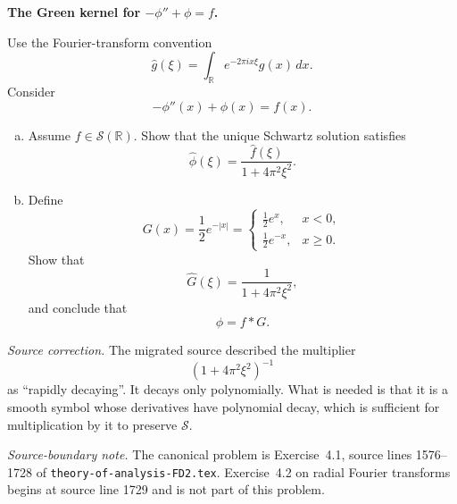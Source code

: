 \begin{problem}[CP-III-0014]
\label{prob:cp-iii-0014}
\textbf{The Green kernel for \(-\phi''+\phi=f\).}

Use the Fourier-transform convention
\[
\widehat g(\xi)
=
\int_{\mathbb R}
e^{-2\pi i x\xi}g(x)\,dx.
\]
Consider
\[
-\phi''(x)+\phi(x)=f(x).
\]

\begin{enumerate}[(a)]
\item Assume \(f\in\mathcal S(\mathbb R)\). Show that the unique Schwartz
solution satisfies
\[
\widehat\phi(\xi)
=
\frac{\widehat f(\xi)}
{1+4\pi^2\xi^2}.
\]

\item Define
\[
G(x)
=
\frac12e^{-|x|}
=
\begin{cases}
\frac12e^x,&x<0,\\[1mm]
\frac12e^{-x},&x\ge0.
\end{cases}
\]
Show that
\[
\widehat G(\xi)
=
\frac1{1+4\pi^2\xi^2},
\]
and conclude that
\[
\phi
=
f*G.
\]
\end{enumerate}

\medskip
\noindent
\textit{Source correction.}
The migrated source described the multiplier
\[
(1+4\pi^2\xi^2)^{-1}
\]
as ``rapidly decaying''. It decays only polynomially. What is needed is
that it is a smooth symbol whose derivatives have polynomial decay, which
is sufficient for multiplication by it to preserve \(\mathcal S\).

\medskip
\noindent
\textit{Source-boundary note.}
The canonical problem is Exercise~4.1, source lines 1576--1728 of
\texttt{theory-of-analysis-FD2.tex}. Exercise~4.2 on radial Fourier
transforms begins at source line 1729 and is not part of this problem.
\end{problem}

